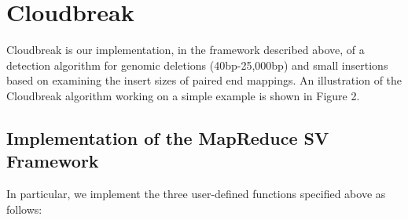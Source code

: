 \documentclass [11pt] {report}
\begin{document}
% 
\chapter{Cloudbreak}

Cloudbreak is our implementation, in the framework described above, of a detection algorithm for genomic deletions (40bp-25,000bp) and small insertions based on examining the insert sizes of paired end mappings. An illustration of the Cloudbreak algorithm working on a simple example is shown in Figure 2.

\section{Implementation of the MapReduce SV Framework}

In particular, we implement the three user-defined functions specified above as follows:
\end{document}
